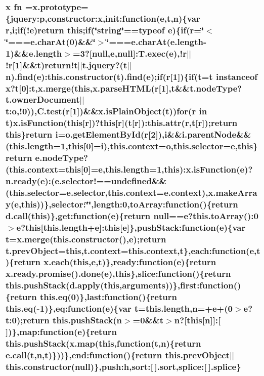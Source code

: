 \hypertarget{jquery-2_80_83_8min_8js_af453dd93808e2e2826fd92ab8c394cfc}{
\subsubsection[{fn}]{\setlength{\rightskip}{0pt plus 5cm}x fn ={\bf x.\+prototype}=\{jquery\+:p,constructor\+:x,init\+:function({\bf e},{\bf t},n)\{var r,i;if(!{\bf e})return this;if(\char`\"{}string\char`\"{}==typeof {\bf e})\{if(r=\char`\"{}$<$\char`\"{}===e.\+char\+At(0)\&\&\char`\"{}$>$\char`\"{}===e.\+char\+At(e.\+length-\/1)\&\&e.\+length$>$=3?\mbox{[}null,{\bf e},null\mbox{]}\+:T.\+exec({\bf e}),!r$\vert$$\vert$!r\mbox{[}1\mbox{]}\&\&{\bf t})return!t$\vert$$\vert$t.\+jquery?({\bf t}$\vert$$\vert$n).find({\bf e})\+:this.\+constructor({\bf t}).find({\bf e});if(r\mbox{[}1\mbox{]})\{if({\bf t}={\bf t} instanceof x?{\bf t}\mbox{[}0\mbox{]}\+:{\bf t},x.\+merge(this,x.\+parse\+H\+T\+M\+L(r\mbox{[}1\mbox{]},{\bf t}\&\&t.\+node\+Type?t.\+owner\+Document$\vert$$\vert$t\+:o,!0)),C.\+test(r\mbox{[}1\mbox{]})\&\&x.\+is\+Plain\+Object({\bf t}))for(r in {\bf t})x.\+is\+Function(this\mbox{[}r\mbox{]})?this\mbox{[}r\mbox{]}({\bf t}\mbox{[}r\mbox{]})\+:this.\+attr(r,{\bf t}\mbox{[}r\mbox{]});return this\}return i=o.\+get\+Element\+By\+Id(r\mbox{[}2\mbox{]}),i\&\&i.\+parent\+Node\&\&(this.\+length=1,this\mbox{[}0\mbox{]}=i),this.\+context=o,this.\+selector={\bf e},this\}return e.\+node\+Type?(this.\+context=this\mbox{[}0\mbox{]}={\bf e},this.\+length=1,this)\+:x.\+is\+Function({\bf e})?{\bf n.\+ready}({\bf e})\+:(e.\+selector!=={\bf undefined}\&\&(this.\+selector=e.\+selector,this.\+context=e.\+context),x.\+make\+Array({\bf e},this))\},selector\+:\char`\"{}\char`\"{},length\+:0,to\+Array\+:function()\{return d.\+call(this)\},get\+:function({\bf e})\{return null=={\bf e}?this.\+to\+Array()\+:0$>${\bf e}?this\mbox{[}this.\+length+{\bf e}\mbox{]}\+:this\mbox{[}{\bf e}\mbox{]}\},push\+Stack\+:function({\bf e})\{var {\bf t}=x.\+merge(this.\+constructor(),{\bf e});return t.\+prev\+Object=this,t.\+context=this.\+context,{\bf t}\},each\+:function({\bf e},{\bf t})\{return {\bf x.\+each}(this,{\bf e},{\bf t})\},ready\+:function({\bf e})\{return {\bf x.\+ready.\+promise}().done({\bf e}),this\},slice\+:function()\{return this.\+push\+Stack(d.\+apply(this,arguments))\},first\+:function()\{return this.\+eq(0)\},last\+:function()\{return this.\+eq(-\/1)\},eq\+:function({\bf e})\{var {\bf t}=this.\+length,n=+{\bf e}+(0$>${\bf e}?t\+:0);return this.\+push\+Stack(n$>$=0\&\&{\bf t}$>$n?\mbox{[}this\mbox{[}n\mbox{]}\mbox{]}\+:\mbox{[}$\,$\mbox{]})\},map\+:function({\bf e})\{return this.\+push\+Stack(x.\+map(this,function({\bf t},n)\{return e.\+call({\bf t},n,{\bf t})\}))\},end\+:function()\{return this.\+prev\+Object$\vert$$\vert$this.\+constructor(null)\},push\+:h,sort\+:\mbox{[}$\,$\mbox{]}.sort,splice\+:\mbox{[}$\,$\mbox{]}.splice\}}}\label{jquery-2_80_83_8min_8js_af453dd93808e2e2826fd92ab8c394cfc}
